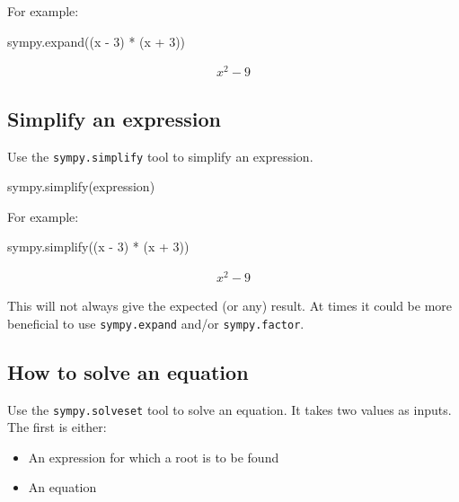 For example:




\begin{pyin}
sympy.expand((x - 3) * (x + 3))
\end{pyin}




\begin{equation*}
\begin{split}\displaystyle x^{2} - 9\end{split}
\end{equation*}




\subsection{Simplify an expression}

Use the \texttt{sympy.simplify} tool to simplify an expression.

\begin{pyin}
sympy.simplify(expression)
\end{pyin}


For example:




\begin{pyin}
sympy.simplify((x - 3) * (x + 3))
\end{pyin}




\begin{equation*}
\begin{split}\displaystyle x^{2} - 9\end{split}
\end{equation*}

\begin{note}
This will not always give the expected (or any) result. At times it could be
more beneficial to use \texttt{sympy.expand} and/or \texttt{sympy.factor}.
\end{note}

\subsection{How to solve an equation}

Use the \texttt{sympy.solveset} tool to solve an equation. It takes two values as
inputs. The first is either:
\begin{itemize}
\item 

An expression for which a root is to be found

\item 

An equation

\end{itemize}


